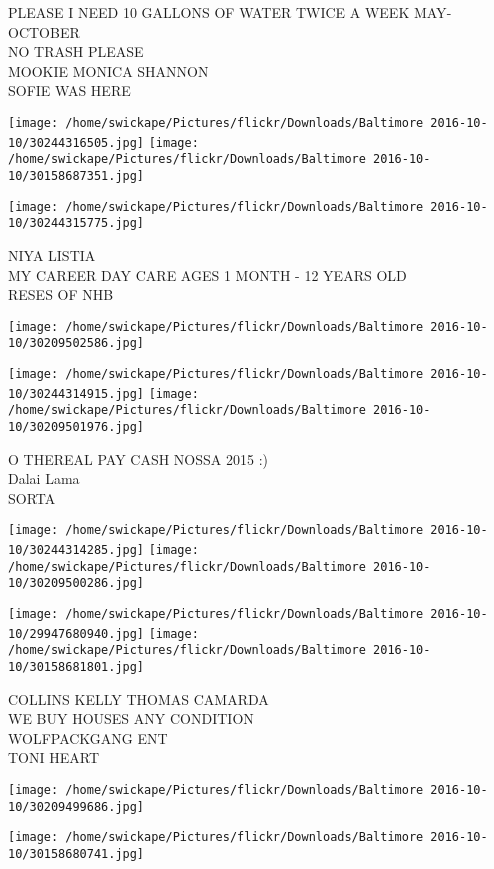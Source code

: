 \documentclass[10pt,letterpaper]{article}
\begin{document}
PLEASE I NEED 10 GALLONS OF WATER TWICE A WEEK MAY{-}OCTOBER\\
NO TRASH PLEASE\\
MOOKIE MONICA SHANNON\\
SOFIE WAS HERE
\pagebreak

\texttt{[image: /home/swickape/Pictures/flickr/Downloads/Baltimore 2016-10-10/30244316505.jpg]}
\texttt{[image: /home/swickape/Pictures/flickr/Downloads/Baltimore 2016-10-10/30158687351.jpg]}

\texttt{[image: /home/swickape/Pictures/flickr/Downloads/Baltimore 2016-10-10/30244315775.jpg]}

NIYA LISTIA\\
MY CAREER DAY CARE AGES 1 MONTH {-} 12 YEARS OLD\\
RESES OF NHB
\pagebreak

\texttt{[image: /home/swickape/Pictures/flickr/Downloads/Baltimore 2016-10-10/30209502586.jpg]}

\vspace{0.25in}
\texttt{[image: /home/swickape/Pictures/flickr/Downloads/Baltimore 2016-10-10/30244314915.jpg]}
\texttt{[image: /home/swickape/Pictures/flickr/Downloads/Baltimore 2016-10-10/30209501976.jpg]}

O THEREAL PAY CASH NOSSA 2015 :)\\
Dalai Lama\\
SORTA
\pagebreak

\texttt{[image: /home/swickape/Pictures/flickr/Downloads/Baltimore 2016-10-10/30244314285.jpg]}
\texttt{[image: /home/swickape/Pictures/flickr/Downloads/Baltimore 2016-10-10/30209500286.jpg]}

\texttt{[image: /home/swickape/Pictures/flickr/Downloads/Baltimore 2016-10-10/29947680940.jpg]}
\texttt{[image: /home/swickape/Pictures/flickr/Downloads/Baltimore 2016-10-10/30158681801.jpg]}

COLLINS KELLY THOMAS CAMARDA\\
WE BUY HOUSES ANY CONDITION\\
WOLFPACKGANG ENT\\
TONI HEART
\pagebreak

\texttt{[image: /home/swickape/Pictures/flickr/Downloads/Baltimore 2016-10-10/30209499686.jpg]}

\vspace{0.25in}
\texttt{[image: /home/swickape/Pictures/flickr/Downloads/Baltimore 2016-10-10/30158680741.jpg]}
\end{document}
